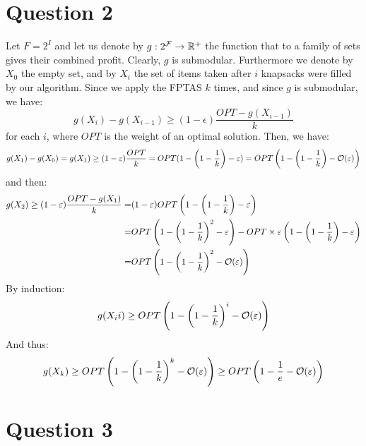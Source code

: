 \documentclass[math, info]{cours}
\begin{document}
\section{Question 2}
Let $F = 2^{I}$ and let us denote by $g: 2^{\mathcal{F}} \to \mathbb{R}^{+}$ the function that to a family of sets gives their combined profit.
Clearly, $g$ is submodular.
Furthermore we denote by $X_{0}$ the empty set, and by $X_{i}$ the set of items taken after $i$ knapsacks were filled by our algorithm.
Since we apply the FPTAS $k$ times, and since $g$ is submodular, we have:
\begin{equation}
  g(X_{i}) - g(X_{i - 1}) \geq (1 - \epsilon)\frac{OPT - g(X_{i - 1})}{k}
	\label{eq:induction}
\end{equation}
for each $i$, where $OPT$ is the weight of an optimal solution.
Then, we have:
\begin{equation}
  g(X_{1}) - g(X_{0}) = g(X_{1}) \geq (1 - \varepsilon)\frac{OPT}{k} = OPT(1 - \left(1 - \frac{1}{k}\right) - \varepsilon) = OPT\left( 1 - \left(1 - \frac{1}{k}\right) - \mathcal{O}(\varepsilon) \right)
	\label{eq:firststep}
\end{equation}
and then:
\begin{equation*}
  \begin{aligned}
    g(X_{2}) \geq (1 - \varepsilon)\frac{OPT - g(X_{1})}{k} =& (1-\varepsilon)OPT\left(1 - \left(1 - \frac{1}{k}\right) - \varepsilon\right)\\
    =& OPT\left( 1 - \left(1 - \frac{1}{k}\right)^{2} - \varepsilon\right) - OPT\times \varepsilon\left(1 - \left(1 - \frac{1}{k}\right) - \varepsilon\right)\\
    =& OPT\left(1 - \left(1 - \frac{1}{k}\right)^{2} - \mathcal{O}(\varepsilon)\right)
  \end{aligned}
\end{equation*}
By induction:
\begin{equation*}
  g(X_{i}i) \geq OPT\left(1 - \left(1 - \frac{1}{k}\right)^{i} - \mathcal{O}(\varepsilon)\right)
\end{equation*}
And thus:
\begin{equation*}
  g(X_{k}) \geq OPT\left(1 - \left(1 - \frac{1}{k}\right)^{k} - \mathcal{O}(\varepsilon)\right) \geq OPT\left(1 - \frac{1}{e} - \mathcal{O}(\varepsilon)\right)
\end{equation*}

\section{Question 3}
\end{document}
